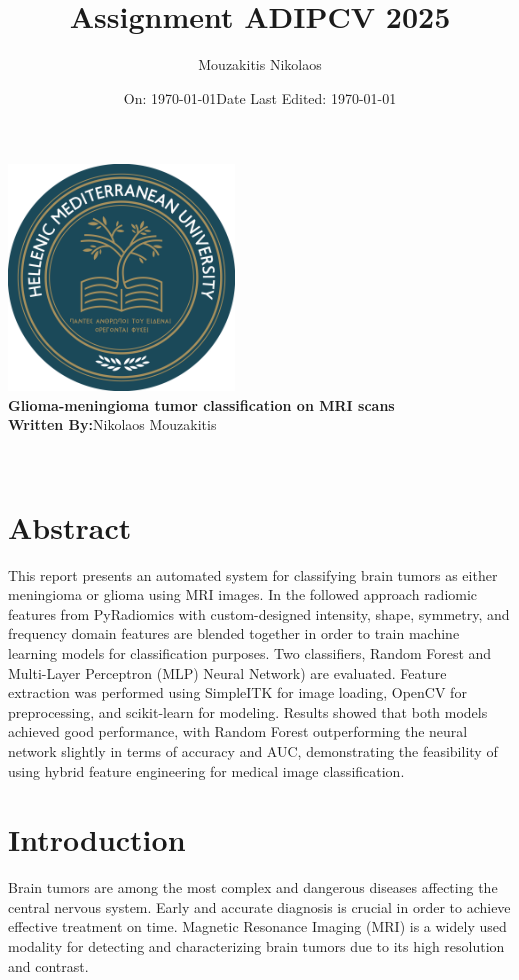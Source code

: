 \documentclass[11pt,a4paper]{report}
\title{\LARGE \textbf{Assignment ADIPCV 2025}}
\author{Mouzakitis Nikolaos}
\date{\large On: \today}
\begin{document}
\makeatletter
\begin{titlepage}
    \centering
    \vspace*{1cm}
       { \includegraphics[width=6cm]{ELMEPA.png}}\\[1cm]

    {\LARGE \textbf{Glioma-meningioma tumor classification on MRI scans }}\\[1cm]
    
    
    \textbf{Written By:}{Nikolaos Mouzakitis}\\[1cm]
    \date{\large Date Last Edited: \today}
    {\@date\\}
\end{titlepage}
\makeatother
\chapter*{Abstract}
This report presents an automated system 
for classifying brain tumors as either meningioma or glioma 
using MRI images. 
In the followed approach radiomic features from PyRadiomics with custom-designed intensity,
shape, symmetry, and frequency domain features are blended together in order to 
train machine learning models for classification purposes. 
Two classifiers, Random Forest and Multi-Layer Perceptron (MLP) Neural Network) are evaluated. 
Feature extraction was performed using SimpleITK for image loading, 
OpenCV for preprocessing, and scikit-learn for modeling. 
Results showed that both models achieved good performance, 
with Random Forest outperforming the neural network slightly in terms of 
accuracy and AUC, demonstrating
the feasibility of using hybrid feature 
engineering for medical image classification.

\tableofcontents

\chapter{Introduction}
Brain tumors are among the most complex and dangerous 
diseases affecting the central nervous system. 
Early and accurate diagnosis is crucial in order to achieve effective treatment on time. 
Magnetic Resonance Imaging (MRI) is a widely used modality for detecting 
and characterizing brain tumors due to its high resolution and contrast.
\end{document}

